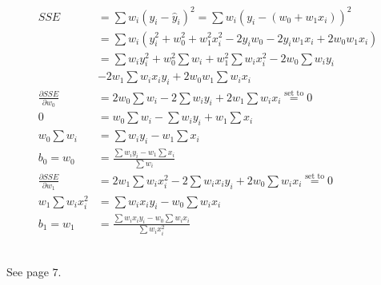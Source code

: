 \documentclass[12pt]{article}
\begin{document}
\begin{enumerate}
$$ \begin{aligned} 
SSE &= \sum w_i(y_i - \hat{y}_i)^2 = \sum w_i(y_i - (w_0 + w_1x_i))^2 \\
 &= \sum w_i(y_i^2 + w_0^2 + w_1^2x_i^2 - 2y_iw_0 - 2y_iw_1x_i + 2w_0w_1x_i) \\
  &= \sum w_iy_i^2 + w_0^2\sum w_i + w_1^2\sum w_ix_i^2 - 2w_0\sum w_iy_i \\
   &- 2w_1\sum w_ix_iy_i + 2w_0w_1\sum w_ix_i \\ 
\frac{\partial SSE}{\partial w_0} &= 2w_0\sum w_i - 2\sum w_iy_i + 2w_1\sum w_ix_i \stackrel{\text{set to}}{=} 0 \\
0 &= w_0\sum w_i - \sum w_iy_i + w_1\sum x_i \\
w_0\sum w_i &= \sum w_iy_i - w_1\sum x_i \\ 
b_0 = w_0 &= \frac{\sum w_iy_i - w_1\sum x_i}{\sum w_i} \\
\frac{\partial SSE}{\partial w_1} &= 2w_1\sum w_ix_i^2 - 2\sum w_ix_iy_i + 2w_0\sum w_ix_i \stackrel{\text{set to}}{=} 0 \\ 
w_1\sum w_ix_i^2 &= \sum w_ix_iy_i - w_0\sum w_ix_i \\
b_1 = w_1 &= \frac{\sum w_ix_iy_i - w_0\sum w_ix_i}{\sum w_ix_i^2} \end{aligned} $$ 

\\ See page $7$. 

\end{enumerate} \newpage
\end{document}
